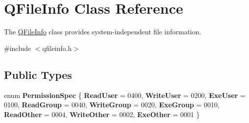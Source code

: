 \hypertarget{class_q_file_info}{}\section{Q\+File\+Info Class Reference}
\label{class_q_file_info}


The \mbox{\hyperlink{class_q_file_info}{Q\+File\+Info}} class provides system-\/independent file information.  




{\ttfamily \#include $<$qfileinfo.\+h$>$}

\subsection*{Public Types}
\begin{DoxyCompactItemize}
\item 
\mbox{\label{class_q_file_info_a7fa0cd94ba7f096133efda899aeafab9}} 
enum {\bfseries Permission\+Spec} \{ \newline
{\bfseries Read\+User} = 0400, 
{\bfseries Write\+User} = 0200, 
{\bfseries Exe\+User} = 0100, 
{\bfseries Read\+Group} = 0040, 
\newline
{\bfseries Write\+Group} = 0020, 
{\bfseries Exe\+Group} = 0010, 
{\bfseries Read\+Other} = 0004, 
{\bfseries Write\+Other} = 0002, 
\newline
{\bfseries Exe\+Other} = 0001
 \}
\end{DoxyCompactItemize}
